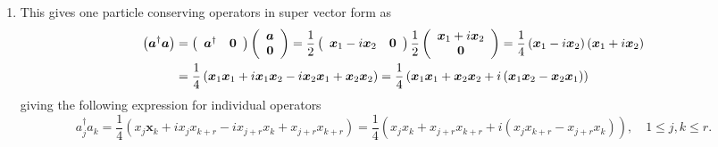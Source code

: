 \documentclass[aps,preprint]{revtex4}%
\begin{document}
\begin{enumerate}
\item This gives one particle conserving operators in super vector form as
\begin{align}
\left(  \boldsymbol{a}^{\dagger}\boldsymbol{a}\right)   &  =\left(
\begin{array}
[c]{cc}%
\boldsymbol{a}^{\dagger} & \boldsymbol{0}%
\end{array}
\right)  \left(
\begin{array}
[c]{c}%
\boldsymbol{a}\\
\boldsymbol{0}%
\end{array}
\right)  =\frac{1}{2}\left(
\begin{array}
[c]{cc}%
\boldsymbol{x}_{1}-i\boldsymbol{x}_{2} & \boldsymbol{0}%
\end{array}
\right)  \frac{1}{2}\left(
\begin{array}
[c]{c}%
\boldsymbol{x}_{1}+i\boldsymbol{x}_{2}\\
\boldsymbol{0}%
\end{array}
\right)  =\frac{1}{4}\left(  \boldsymbol{x}_{1}-i\boldsymbol{x}_{2}\right)
\left(  \boldsymbol{x}_{1}+i\boldsymbol{x}_{2}\right)  \\
&  =\frac{1}{4}\left(  \boldsymbol{x}_{1}\boldsymbol{x}_{1}+i\boldsymbol{x}%
_{1}\boldsymbol{x}_{2}-i\boldsymbol{x}_{2}\boldsymbol{x}_{1}+\boldsymbol{x}%
_{2}\boldsymbol{x}_{2}\right)  =\frac{1}{4}\left(  \boldsymbol{x}%
_{1}\boldsymbol{x}_{1}+\boldsymbol{x}_{2}\boldsymbol{x}_{2}+i\left(
\boldsymbol{x}_{1}\boldsymbol{x}_{2}-\boldsymbol{x}_{2}\boldsymbol{x}%
_{1}\right)  \right)
\end{align}
giving the following expression for individual operators
\begin{equation}
a_{j}^{\dagger}a_{k}=\frac{1}{4}\left(  x_{j}\boldsymbol{x}_{k}+ix_{j}%
x_{k+r}-ix_{j+r}x_{k}+x_{j+r}x_{k+r}\right)  =\frac{1}{4}\left(
\overset{}{x_{j}x_{k}+x_{j+r}x_{k+r}+i\left(  x_{j}x_{k+r}-x_{j+r}%
x_{k}\right)  }\right)  ,\quad1\leq j,k\leq r.
\end{equation}



\end{enumerate}
\end{document}
